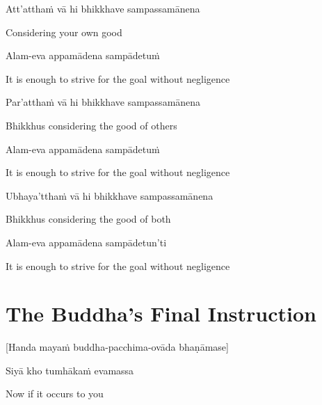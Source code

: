 Att’atthaṁ vā hi bhikkhave sampassamānena

\begin{cprenglish}
  Considering your own good
\end{cprenglish}

Alam-eva appamādena sampādetuṁ

\begin{cprenglish}
  It is enough to strive for the goal without negligence
\end{cprenglish}

Par’atthaṁ vā hi bhikkhave sampassamānena

\begin{cprenglish}
  Bhikkhus considering the good of others
\end{cprenglish}

Alam-eva appamādena sampādetuṁ

\begin{cprenglish}
  It is enough to strive for the goal without negligence
\end{cprenglish}

Ubhaya’tthaṁ vā hi bhikkhave sampassamānena

\begin{cprenglish}
  Bhikkhus considering the good of both
\end{cprenglish}

Alam-eva appamādena sampādetun'ti

\begin{cprenglish}
  It is enough to strive for the goal without negligence
\end{cprenglish}

\suttaRef{[SN 12.22]}

\clearpage

\section{The Buddha's Final Instruction}
\label{buddhas-final-instruction}

\begin{center}
  [Handa mayaṁ buddha-pacchima-ovāda bhaṇāmase]
\end{center}

Siyā kho tumhākaṁ evamassa

\begin{cprenglish}
  Now if it occurs to you
\end{cprenglish}

